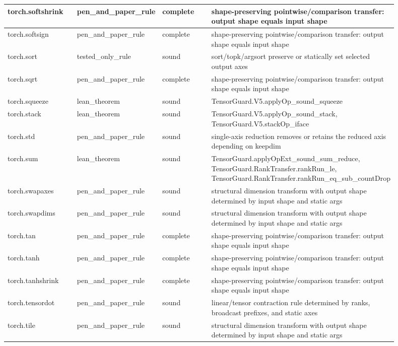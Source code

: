 \documentclass[10pt]{article}
\begin{document}
\begin{longtable}{|p{0.20\linewidth}|p{0.18\linewidth}|p{0.16\linewidth}|p{0.36\linewidth}|}
\hline
torch.softshrink & pen\_and\_paper\_rule & complete & shape-preserving pointwise/comparison transfer: output shape equals input shape \\
\hline
torch.softsign & pen\_and\_paper\_rule & complete & shape-preserving pointwise/comparison transfer: output shape equals input shape \\
\hline
torch.sort & tested\_only\_rule & sound & sort/topk/argsort preserve or statically set selected output axes \\
\hline
torch.sqrt & pen\_and\_paper\_rule & complete & shape-preserving pointwise/comparison transfer: output shape equals input shape \\
\hline
torch.squeeze & lean\_theorem & sound & TensorGuard.V5.applyOp\_sound\_squeeze \\
\hline
torch.stack & lean\_theorem & sound & TensorGuard.V5.applyOp\_sound\_stack, TensorGuard.V5.stackOp\_iface \\
\hline
torch.std & pen\_and\_paper\_rule & sound & single-axis reduction removes or retains the reduced axis depending on keepdim \\
\hline
torch.sum & lean\_theorem & sound & TensorGuard.applyOpExt\_sound\_sum\_reduce, TensorGuard.RankTransfer.rankRun\_le, TensorGuard.RankTransfer.rankRun\_eq\_sub\_countDrop \\
\hline
torch.swapaxes & pen\_and\_paper\_rule & sound & structural dimension transform with output shape determined by input shape and static args \\
\hline
torch.swapdims & pen\_and\_paper\_rule & sound & structural dimension transform with output shape determined by input shape and static args \\
\hline
torch.tan & pen\_and\_paper\_rule & complete & shape-preserving pointwise/comparison transfer: output shape equals input shape \\
\hline
torch.tanh & pen\_and\_paper\_rule & complete & shape-preserving pointwise/comparison transfer: output shape equals input shape \\
\hline
torch.tanhshrink & pen\_and\_paper\_rule & complete & shape-preserving pointwise/comparison transfer: output shape equals input shape \\
\hline
torch.tensordot & pen\_and\_paper\_rule & sound & linear/tensor contraction rule determined by ranks, broadcast prefixes, and static axes \\
\hline
torch.tile & pen\_and\_paper\_rule & sound & structural dimension transform with output shape determined by input shape and static args \\

\end{longtable}
\end{document}
